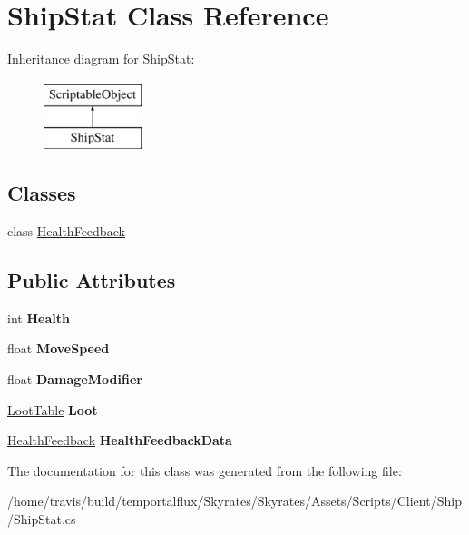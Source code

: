 \hypertarget{class_ship_stat}{\section{Ship\-Stat Class Reference}
\label{class_ship_stat}
}
Inheritance diagram for Ship\-Stat\-:\begin{figure}[H]
\begin{center}
\leavevmode
\includegraphics[height=2.000000cm]{class_ship_stat}
\end{center}
\end{figure}
\subsection*{Classes}
\begin{DoxyCompactItemize}
\item 
class \hyperlink{class_ship_stat_1_1_health_feedback}{Health\-Feedback}
\end{DoxyCompactItemize}
\subsection*{Public Attributes}
\begin{DoxyCompactItemize}
\item 
\hypertarget{class_ship_stat_ab29fff973cecbe0c852a67b70a41bce7}{int {\bfseries Health}}\label{class_ship_stat_ab29fff973cecbe0c852a67b70a41bce7}

\item 
\hypertarget{class_ship_stat_a5eb3933b4e82d370adf8fe3b781b3f5e}{float {\bfseries Move\-Speed}}\label{class_ship_stat_a5eb3933b4e82d370adf8fe3b781b3f5e}

\item 
\hypertarget{class_ship_stat_af6fce7bb672881aa282ca755540f28d1}{float {\bfseries Damage\-Modifier}}\label{class_ship_stat_af6fce7bb672881aa282ca755540f28d1}

\item 
\hypertarget{class_ship_stat_a5c1c8d0ae16df851e395e157bb53d45a}{\hyperlink{class_skyrates_1_1_client_1_1_loot_1_1_loot_table}{Loot\-Table} {\bfseries Loot}}\label{class_ship_stat_a5c1c8d0ae16df851e395e157bb53d45a}

\item 
\hypertarget{class_ship_stat_ac7f6b53aa68139139b5fe1ccd8e3da38}{\hyperlink{class_ship_stat_1_1_health_feedback}{Health\-Feedback} {\bfseries Health\-Feedback\-Data}}\label{class_ship_stat_ac7f6b53aa68139139b5fe1ccd8e3da38}

\end{DoxyCompactItemize}


The documentation for this class was generated from the following file\-:\begin{DoxyCompactItemize}
\item 
/home/travis/build/temportalflux/\-Skyrates/\-Skyrates/\-Assets/\-Scripts/\-Client/\-Ship/Ship\-Stat.\-cs\end{DoxyCompactItemize}
